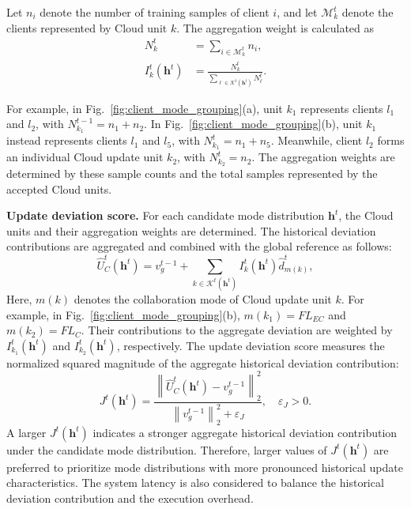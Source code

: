 \documentclass[5p,times]{elsarticle}
\theoremstyle{plain}
\theoremstyle{definition}
\theoremstyle{remark}
\begin{document}
Let $n_i$ denote the number of training samples
of client $i$, and let $\mathcal M_k^t$ denote
the clients represented by Cloud unit $k$.
The aggregation weight is calculated as
\begin{equation}
\begin{aligned}
N_k^t
&=\sum_{i\in\mathcal M_k^t}n_i,\\
I_k^t(\mathbf h^t)
&=\frac{N_k^t}
{\sum_{\ell\in\mathcal K^t(\mathbf h^t)}N_\ell^t}.
\end{aligned}
\label{eq:cloud_unit_weights}
\end{equation}

For example, in Fig.~\ref{fig:client_mode_grouping}(a),
unit $k_1$ represents clients $l_1$ and $l_2$,
with $N_{k_1}^{t-1}=n_1+n_2$.
In Fig.~\ref{fig:client_mode_grouping}(b),
unit $k_1$ instead represents clients $l_1$
and $l_5$, with $N_{k_1}^t=n_1+n_5$.
Meanwhile, client $l_2$ forms an individual
Cloud update unit $k_2$, with $N_{k_2}^t=n_2$.
The aggregation weights are determined by
these sample counts and the total samples
represented by the accepted Cloud units.

\textbf{Update deviation score.}
For each candidate mode distribution $\mathbf h^t$,
the Cloud units and their aggregation weights are determined.
The historical deviation contributions are aggregated
and combined with the global reference as follows:
\begin{equation}
\widehat U_C^t(\mathbf h^t)
=v_g^{t-1}
+\sum_{k\in\mathcal K^t(\mathbf h^t)}
I_k^t(\mathbf h^t)\widehat d_{m(k)}^t,
\label{eq:predicted_cloud_update}
\end{equation}
Here, $m(k)$ denotes the collaboration mode
of Cloud update unit $k$.
For example, in Fig.~\ref{fig:client_mode_grouping}(b),
$m(k_1)=FL_{EC}$ and $m(k_2)=FL_C$.
Their contributions to the aggregate deviation
are weighted by $I_{k_1}^t(\mathbf h^t)$
and $I_{k_2}^t(\mathbf h^t)$, respectively.
The update deviation score measures the normalized
squared magnitude of the aggregate historical
deviation contribution:
\begin{equation}
J^t(\mathbf h^t)
=\frac{\left\|\widehat U_C^t(\mathbf h^t)
-v_g^{t-1}\right\|_2^2}
{\left\|v_g^{t-1}\right\|_2^2+\varepsilon_J},
\quad\varepsilon_J>0.
\label{eq:j_learn_estimate}
\end{equation}
A larger $J^t(\mathbf h^t)$ indicates a stronger
aggregate historical deviation contribution
under the candidate mode distribution.
Therefore, larger values of $J^t(\mathbf h^t)$
are preferred to prioritize mode distributions
with more pronounced historical update
characteristics.
The system latency is also considered to
balance the historical deviation contribution
and the execution overhead.
\end{document}
